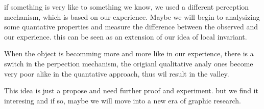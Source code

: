 if something is very like to something we know, we used a different perception mechanism, which is based on our experience.
Maybe we will begin to analysizing some quantative properties and measure the difference between the observed and our experience.
this can be seen as an extension of our idea of local invariant.


When the object is becomming more and more like in our experience, there is a switch in the perpection mechanism, the origianl qualitative analy ones become very poor alike in the quantative approach,
thus wil result in the valley.

This idea is just a propose and need further proof and experiment.
but we find it interesing and if so, maybe we will move into a new era of graphic research.





